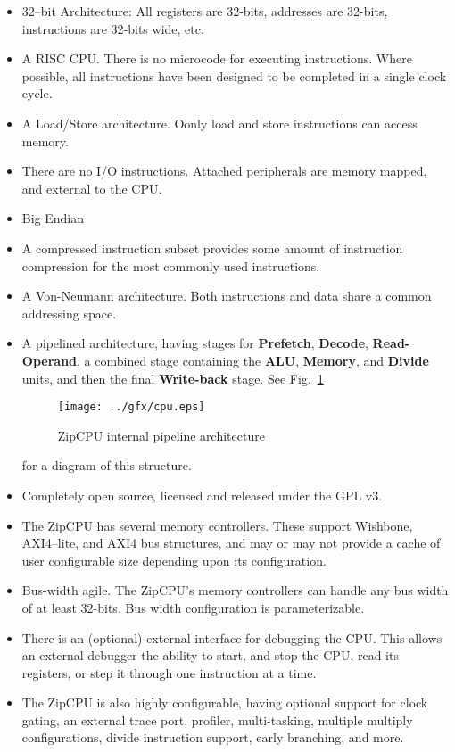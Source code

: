 \documentclass{gqtekspec}
\begin{document}
\begin{itemize}
\item 32--bit Architecture: All registers are 32-bits, addresses are 32-bits,
		instructions are 32-bits wide, etc.

\item A RISC CPU.  There is no microcode for executing instructions.
	Where possible, all instructions have been designed to be completed
	in a single clock cycle.

\item A Load/Store architecture.  Oonly load and store instructions
	can access memory.

\item There are no I/O instructions.  Attached peripherals are memory
	mapped, and external to the CPU.

\item Big Endian

\item A compressed instruction subset provides some amount of instruction
	compression for the most commonly used instructions.

\item A Von-Neumann architecture.  Both instructions and data share a 
	common addressing space.

\item A pipelined architecture, having stages for {\bf Prefetch},
	{\bf Decode}, {\bf Read-Operand}, a combined stage containing
	the {\bf ALU}, {\bf Memory}, and {\bf Divide} units, and then the
	final {\bf Write-back} stage.  See Fig.~\ref{fig:cpu}
\begin{figure}\begin{center}
\texttt{[image: ../gfx/cpu.eps]}
\caption{ZipCPU internal pipeline architecture}\label{fig:cpu}
\end{center}\end{figure}
	for a diagram of this structure.

\item Completely open source, licensed and released under the GPL v3.

\item The ZipCPU has several memory controllers.  These support Wishbone,
	AXI4--lite, and AXI4 bus structures, and may or may not provide a
	cache of user configurable size depending upon its configuration.

\item Bus-width agile.  The ZipCPU's memory controllers can handle any bus
	width of at least 32-bits.  Bus width configuration is parameterizable.

\item There is an (optional) external interface for debugging the CPU.  This
	allows an external debugger the ability to start, and stop the CPU,
	read its registers, or step it through one instruction at a time.

\item The ZipCPU is also highly configurable, having optional support for
	clock gating, an external trace port, profiler, 
	multi-tasking, multiple multiply configurations, divide instruction
	support, early branching, and more.
\end{itemize}
\end{document}

